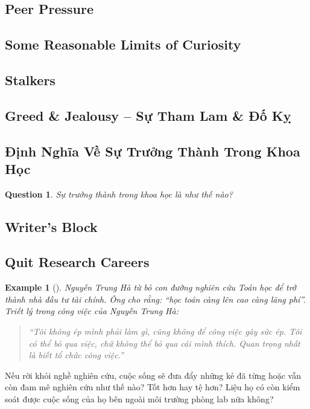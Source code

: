 \documentclass{article}
\numberwithin{equation}{section}
\newtheorem{example}{Example}[section]
\newtheorem{ques}{Question}[section]
\begin{document}
\subsection{Peer Pressure}

\subsection{Some Reasonable Limits of Curiosity}

\subsection{Stalkers}

\subsection{Greed \& Jealousy -- Sự Tham Lam \& Đố Kỵ}

\subsection{Định Nghĩa Về Sự Trưởng Thành Trong Khoa Học}
\begin{ques}
	Sự trưởng thành trong khoa học là như thế nào?
\end{ques}

\subsection{Writer's Block}

\subsection{Quit Research Careers}

\begin{example}[\cite{VNE/NTH}]
	Nguyễn Trung Hà từ bỏ con đường nghiên cứu Toán học để trở thành nhà đầu tư tài chính. Ông cho rằng: ``học toán càng lên cao càng lãng phí''. Triết lý trong công việc của Nguyễn Trung Hà:
	\begin{quotation}
		``Tôi không ép mình phải làm gì, cũng không để công việc gây sức ép. Tôi có thể bỏ qua việc, chứ không thể bỏ qua cái mình thích. Quan trọng nhất là biết tổ chức công việc.''
	\end{quotation}
	
\end{example}
Nếu rời khỏi nghề nghiên cứu, cuộc sống sẽ đưa đẩy những kẻ đã từng hoặc vẫn còn đam mê nghiên cứu như thế nào? Tốt hơn hay tệ hơn? Liệu họ có còn kiểm soát được cuộc sống của họ bên ngoài môi trường phòng lab nữa không?
\end{document}

